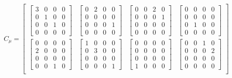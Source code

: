 \documentclass[twocolumn,10pt]{asme2ej}
\begin{document}
\begin{equation}
    C_{\mu} = \begin{bmatrix}
    \begin{bmatrix} 3 & 0 & 0 & 0 \\ 0 & 1 & 0 & 0 \\ 0 & 0 & 1 & 0 \\ 0 & 0 & 0 & 0 \end{bmatrix} &
    \begin{bmatrix} 0 & 2 & 0 & 0 \\ 0 & 0 & 0 & 0 \\ 0 & 0 & 0 & 1 \\ 0 & 0 & 0 & 0 \end{bmatrix} &
    \begin{bmatrix} 0 & 0 & 2 & 0 \\ 0 & 0 & 0 & 1 \\ 0 & 0 & 0 & 0 \\ 0 & 0 & 0 & 0 \end{bmatrix} &
    \begin{bmatrix}0 & 0 & 0 & 0 \\ 0 & 0 & 0 & 0 \\ 0 & 1 & 0 & 0 \\ 0 & 0 & 0 & 0 \end{bmatrix} \\
      \begin{bmatrix} 0 & 0 & 0 & 0 \\ 2 & 0 & 0 & 0 \\ 0 & 0 & 0 & 0 \\ 0 & 0 & 1 & 0 \end{bmatrix} &
      \begin{bmatrix} 1 & 0 & 0 & 0 \\ 0 & 3 & 0 & 0 \\ 0 & 0 & 0 & 0 \\ 0 & 0 & 0 & 1 \end{bmatrix} &
      \begin{bmatrix} 0 & 0 & 0 & 0 \\ 0 & 0 & 0 & 0 \\ 0 & 0 & 0 & 0 \\ 1 & 0 & 0 & 0 \end{bmatrix} &
      \begin{bmatrix}0 & 0 & 1 & 0 \\ 0 & 0 & 0 & 2 \\ 0 & 0 & 0 & 0 \\ 0 & 0 & 0 & 0 \end{bmatrix} \\

\end{bmatrix}
\end{equation}
\end{document}
